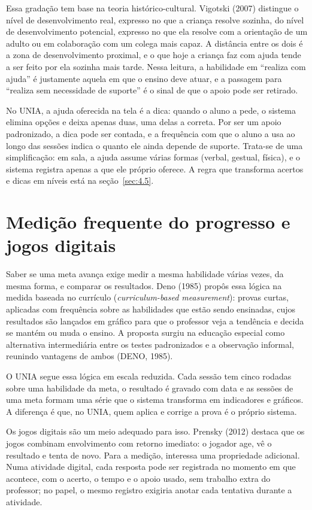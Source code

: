 Essa gradação tem base na teoria histórico-cultural. Vigotski (2007) distingue o nível de desenvolvimento real, expresso no que a criança resolve sozinha, do nível de desenvolvimento potencial, expresso no que ela resolve com a orientação de um adulto ou em colaboração com um colega mais capaz. A distância entre os dois é a zona de desenvolvimento proximal, e o que hoje a criança faz com ajuda tende a ser feito por ela sozinha mais tarde. Nessa leitura, a habilidade em “realiza com ajuda” é justamente aquela em que o ensino deve atuar, e a passagem para “realiza sem necessidade de suporte” é o sinal de que o apoio pode ser retirado.

No UNIA, a ajuda oferecida na tela é a dica: quando o aluno a pede, o sistema elimina opções e deixa apenas duas, uma delas a correta. Por ser um apoio padronizado, a dica pode ser contada, e a frequência com que o aluno a usa ao longo das sessões indica o quanto ele ainda depende de suporte. Trata-se de uma simplificação: em sala, a ajuda assume várias formas (verbal, gestual, física), e o sistema registra apenas a que ele próprio oferece. A regra que transforma acertos e dicas em níveis está na seção~\ref{sec:4.5}.

\section{Medição frequente do progresso e jogos digitais}\label{sec:2.4}

Saber se uma meta avança exige medir a mesma habilidade várias vezes, da mesma forma, e comparar os resultados. Deno (1985) propôs essa lógica na medida baseada no currículo (\textit{curriculum-based measurement}): provas curtas, aplicadas com frequência sobre as habilidades que estão sendo ensinadas, cujos resultados são lançados em gráfico para que o professor veja a tendência e decida se mantém ou muda o ensino. A proposta surgiu na educação especial como alternativa intermediária entre os testes padronizados e a observação informal, reunindo vantagens de ambos (DENO, 1985).

O UNIA segue essa lógica em escala reduzida. Cada sessão tem cinco rodadas sobre uma habilidade da meta, o resultado é gravado com data e as sessões de uma meta formam uma série que o sistema transforma em indicadores e gráficos. A diferença é que, no UNIA, quem aplica e corrige a prova é o próprio sistema.

Os jogos digitais são um meio adequado para isso. Prensky (2012) destaca que os jogos combinam envolvimento com retorno imediato: o jogador age, vê o resultado e tenta de novo. Para a medição, interessa uma propriedade adicional. Numa atividade digital, cada resposta pode ser registrada no momento em que acontece, com o acerto, o tempo e o apoio usado, sem trabalho extra do professor; no papel, o mesmo registro exigiria anotar cada tentativa durante a atividade.

